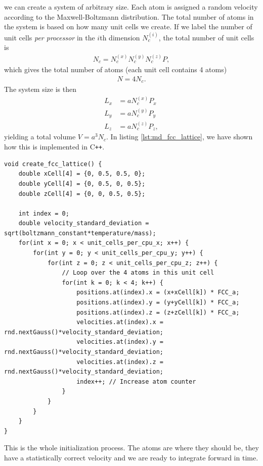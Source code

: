 we can create a system of arbitrary size. Each atom is assigned a random velocity according to the Maxwell-Boltzmann distribution. The total number of atoms in the system is based on how many unit cells we create. If we label the number of unit cells \textit{per processor} in the $i$th dimension $N_c^{(i)}$, the total number of unit cells is
\begin{align}
	N_c = N_c^{(x)}N_c^{(y)}N_c^{(z)} P,
\end{align}
which gives the total number of atoms (each unit cell contains 4 atoms)
\begin{align}
	N = 4N_c.
\end{align}
The system size is then
\begin{align}
	L_x &= aN_c^{(x)}P_x\\
	L_y &= aN_c^{(y)}P_y\\
	L_z &= aN_c^{(z)}P_z,
\end{align}
yielding a total volume $V = a^3N_c$. In listing \ref{lst:md_fcc_lattice}, we have shown how this is implemented in C{}\verb!++!.
\begin{lstlisting}[caption=Code example showing how to create an FCC lattice on one of the processors., label=lst:md_fcc_lattice]
void create_fcc_lattice() {
    double xCell[4] = {0, 0.5, 0.5, 0};
    double yCell[4] = {0, 0.5, 0, 0.5};
    double zCell[4] = {0, 0, 0.5, 0.5};

    int index = 0;
    double velocity_standard_deviation = sqrt(boltzmann_constant*temperature/mass);
    for(int x = 0; x < unit_cells_per_cpu_x; x++) {
        for(int y = 0; y < unit_cells_per_cpu_y; y++) {
            for(int z = 0; z < unit_cells_per_cpu_z; z++) {
                // Loop over the 4 atoms in this unit cell
                for(int k = 0; k < 4; k++) {
                    positions.at(index).x = (x+xCell[k]) * FCC_a;
                    positions.at(index).y = (y+yCell[k]) * FCC_a;
                    positions.at(index).z = (z+zCell[k]) * FCC_a;
                    velocities.at(index).x = rnd.nextGauss()*velocity_standard_deviation;
                    velocities.at(index).y = rnd.nextGauss()*velocity_standard_deviation;
                    velocities.at(index).z = rnd.nextGauss()*velocity_standard_deviation;
                    index++; // Increase atom counter
                }
            }
        }
    }
}
\end{lstlisting}
This is the whole initialization process. The atoms are where they should be, they have a statistically correct velocity and we are ready to integrate forward in time.